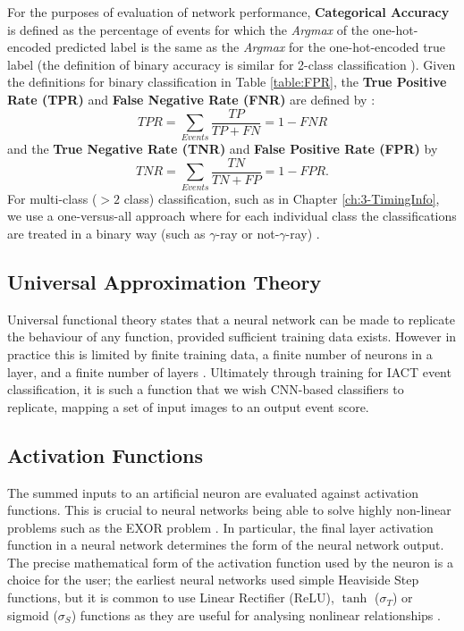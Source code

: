 For the purposes of evaluation of network performance, \textbf{Categorical Accuracy} \cite{Keras} is defined as the percentage of events for which the \textit{Argmax} of the one-hot-encoded predicted label is the same as the \textit{Argmax} for the one-hot-encoded true label (the definition of binary accuracy is similar for 2-class classification \cite{Keras}). Given the definitions for binary classification in Table \ref{table:FPR}, the \textbf{True Positive Rate (TPR)} and \textbf{False Negative Rate (FNR)} are defined by \cite{fawcett}:
\begin{equation}
    TPR=\sum_{Events}\frac{TP}{TP+FN}=1-FNR
\end{equation}
and the \textbf{True Negative Rate (TNR)} and \textbf{False Positive Rate (FPR)} by
\begin{equation}
    TNR=\sum_{Events}\frac{TN}{TN+FP}=1-FPR.
\end{equation} For multi-class ($>2$ class) classification, such as in Chapter \ref{ch:3-TimingInfo}, we use a one-versus-all approach where for each individual class the classifications are treated in a binary way (such as $\gamma$-ray or not-$\gamma$-ray) \cite{fawcett}\cite{scikit}. 

\subsection{Universal Approximation Theory}
Universal functional theory states that a neural network can be made to replicate the behaviour of any function, provided sufficient training data exists. However in practice this is limited by finite training data, a finite number of neurons in a layer, and a finite number of layers \cite{universal}. Ultimately through training for IACT event classification, it is such a function that we wish CNN-based classifiers to replicate, mapping a set of input images to an output event score. 

\subsection{Activation Functions}

The summed inputs to an artificial neuron are evaluated against activation functions. This is crucial to neural networks being able to solve highly non-linear problems such as the EXOR problem \cite{universal}. In particular, the final layer activation function in a neural network determines the form of the neural network output. The precise mathematical form of the activation function used by the neuron is a choice for the user; the earliest neural networks used simple Heaviside Step functions, but 
it is common to use Linear Rectifier (ReLU), $\tanh$ ($\sigma_T$) or sigmoid ($\sigma_S$) functions as they are useful for analysing nonlinear relationships \cite{C++CNN} \cite{Keras}. 

